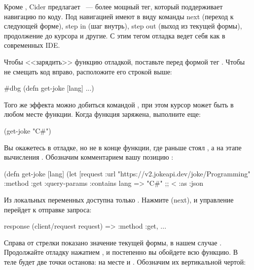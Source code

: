 Кроме , Cider предлагает ~--- более мощный тег, который поддерживает навигацию по коду. Под навигацией имеют в виду команды next (переход к следующей форме), step in (шаг внутрь), step out (выход из текущей формы), продолжение до курсора и другие. С этим тегом отладка ведет себя как в современных IDE.

Чтобы <<зарядить>> функцию отладкой, поставьте перед формой  тег . Чтобы не смещать код вправо, расположите его строкой выше:

\begin{english}
  \begin{clojure}
#dbg
(defn get-joke [lang]
  ...)
  \end{clojure}
\end{english}

Того же эффекта можно добиться командой , при этом курсор может быть в любом месте функции. Когда функция заряжена, выполните еще:

\begin{english}
  \begin{clojure}
(get-joke "C#")
  \end{clojure}
\end{english}

Вы окажетесь в отладке, но не в конце функции, где раньше стоял , а на этапе вычисления . Обозначим комментарием вашу позицию :

\begin{english}
  \begin{clojure/lines}
(defn get-joke [lang]
  (let [request
        {:url "https://v2.jokeapi.dev/joke/Programming"
         :method :get
         :query-params {:contains lang} => "C#" ;; <
         :as :json}
  \end{clojure/lines}
\end{english}

Из локальных переменных доступна только . Нажмите  (next), и управление перейдет к отправке запроса:

\begin{english}
  \begin{clojure}
response
(client/request request) => {:method :get, ...}
  \end{clojure}
\end{english}

Справа от стрелки показано значение текущей формы, в нашем случае . Продолжайте отладку нажатием , и постепенно вы обойдете всю функцию. В теле  будет две точки останова: на месте  и . Обозначим их вертикальной чертой:

